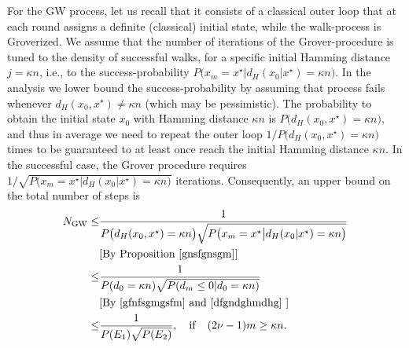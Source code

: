 \documentclass[a4paper,aps,floatfix]{revtex4}
\begin{document}
For the GW process, let us recall that it consists of a classical outer loop that at each round assigns a definite (classical) initial state, while the walk-process is Groverized. We assume that the number of iterations of the Grover-procedure is tuned to the density of successful walks, for a specific initial Hamming distance $j = \kappa n$, i.e., to the success-probability $P\big(x_m = x^{\star}\big|d_H(x_0|x^{\star}) = \kappa n\big)$. In the analysis we lower bound the success-probability by assuming that process fails whenever $d_H(x_0,x^{\star}) \neq \kappa n$ (which may be pessimistic).  The probability to obtain the initial state $x_0$ with Hamming distance $\kappa n$ is $P\big(d_H(x_0,x^{\star}) =\kappa n\big)$, and thus in average we need to repeat the outer loop $1/P\big(d_H(x_0,x^{\star}) =\kappa n\big)$ times to be guaranteed to at least once reach the initial Hamming distance $\kappa n$. In the successful case, the Grover procedure requires $1/\sqrt{P\big(x_m = x^{\star}\big|d_H(x_0|x^{\star}) = \kappa n\big)}$ iterations. Consequently, an upper bound on the total number of steps is 
\begin{equation}
\begin{split}
N_{\mathrm{GW}} \leq & \frac{1}{P\big(d_H(x_0,x^{\star}) =\kappa n\big)\sqrt{P\big(x_m = x^{\star}\big|d_H(x_0|x^{\star}) = \kappa n\big)}}\\
& [\textrm{By Proposition \eqref{gnsfgnsgm}}]\\
\leq &\frac{1}{P(d_0 = \kappa n)\sqrt{P(d_m\leq 0|d_0 = \kappa n)}}\\
& [\textrm{By \eqref{gfnfsgmgsfm} and \eqref{dfgndghmdhg}
}]\\
\leq & \frac{1}{P(E_1)\sqrt{P(E_2)}},\quad \mathrm{if}\quad (2\nu -1)m\geq \kappa n.
\end{split}
\end{equation}
\end{document}
